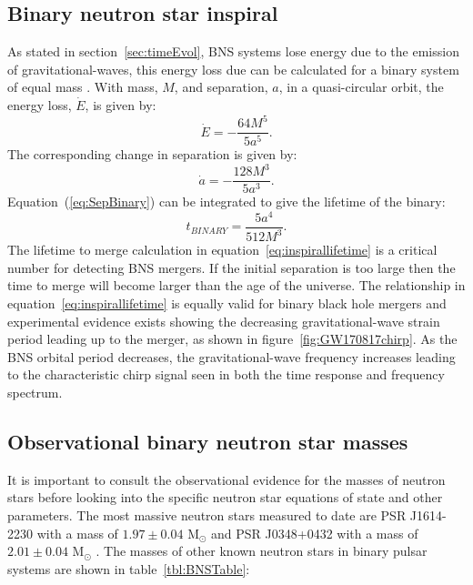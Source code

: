 \subsection{Binary neutron star inspiral}
\label{sec:inspiral}
As stated in section~\ref{sec:timeEvol}, BNS systems lose energy due to the emission of gravitational-waves, this energy loss due can be calculated for a binary system of equal mass \cite[chap 7.5-7.6]{CarrollSpacetimeGeometry}. With mass, $M$, and separation, $a$, in a quasi-circular orbit, the energy loss, $\dot{E}$, is given by:
\begin{equation}
\dot{E} = -\dfrac{64 M^5}{5 a^5}.
\label{eq:ElossBinary}
\end{equation}
The corresponding change in separation is given by:
\begin{equation}
\dot{a} = -\dfrac{128 M^3}{5a^3}.
\label{eq:SepBinary}
\end{equation}
Equation~(\ref{eq:SepBinary}) can be integrated to give the lifetime of the binary:
\begin{equation}
t_{BINARY} = \dfrac{5 a^4}{512 M^3}.
\label{eq:inspirallifetime}
\end{equation}
The lifetime to merge calculation in equation~\ref{eq:inspirallifetime} is a critical number for detecting BNS mergers. If the initial separation is too large then the time to merge will become larger than the age of the universe. The relationship in equation~\ref{eq:inspirallifetime} is equally valid for binary black hole mergers and experimental evidence exists showing the decreasing gravitational-wave strain period leading up to the merger, as shown in figure~\ref{fig:GW170817chirp}. As the BNS orbital period decreases, the gravitational-wave frequency  increases leading to the characteristic chirp signal seen in both the time response and frequency spectrum.

\subsection{Observational binary neutron star masses}
\label{sec:NSmass}
It is important to consult the observational evidence for the masses of neutron stars before looking into the specific neutron star equations of state and other parameters. The most massive neutron stars measured to date are PSR J1614-2230 with a mass of $1.97\pm 0.04 $ M$_\odot$ \citep{Demorest2010} and PSR J0348+0432 with a mass of $2.01 \pm 0.04$ M$_\odot$ \citep{Antoniadis2013}. The masses of other known neutron stars in binary pulsar systems are shown in table~\ref{tbl:BNSTable}:

